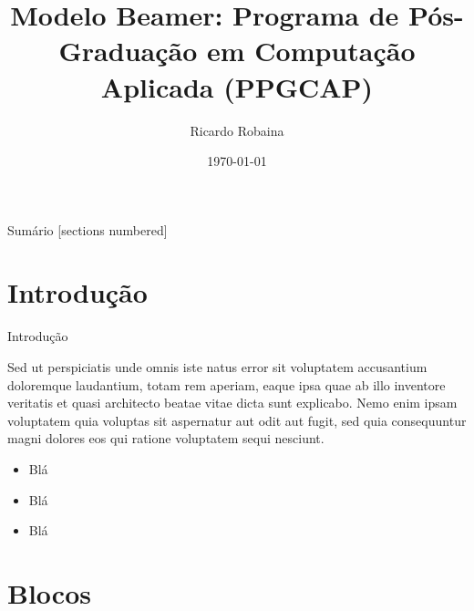 \documentclass[aspectratio=1610]{beamer}
\institute{Programa de Pós-Graduação em Computação Aplicada (PPGCAP)}
\author{Ricardo Robaina}
\title{Modelo Beamer: Programa de Pós-Graduação em Computação Aplicada (PPGCAP)}
\date{\today}
\begin{document}
	
	\begin{frame}{}
		\titlepage
		\thispagestyle{empty}
	\end{frame}
	
	\begin{frame}{Sumário}
		[sections numbered]
		\tableofcontents[hideallsubsections]
	\end{frame}



	\section{Introdução}
	
	\begin{frame}{Introdução}
	
		Sed ut perspiciatis unde omnis iste natus error sit voluptatem accusantium doloremque laudantium, totam rem aperiam, eaque ipsa quae ab illo inventore veritatis et quasi architecto beatae vitae dicta sunt explicabo. Nemo enim ipsam voluptatem quia voluptas sit aspernatur aut odit aut fugit, sed quia consequuntur magni dolores eos qui ratione voluptatem sequi nesciunt. 
	
		\begin{itemize}
			\item Blá
			\item Blá
			\item Blá
		\end{itemize}
	
	\end{frame}


	\section{Blocos}
	
\end{document}
